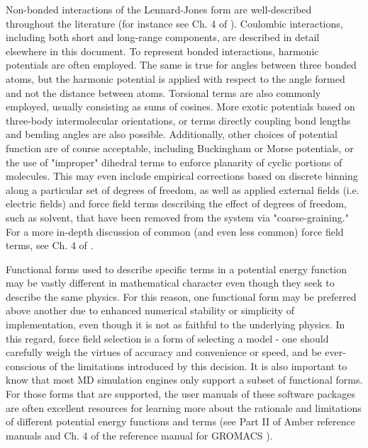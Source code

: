 \documentclass[9pt,bestpractices]{livecoms}
\begin{document}
Non-bonded interactions of the Lennard-Jones form are well-described 
throughout the literature (for instance see Ch. 4 of \citet{LeachBook}). 
Coulombic interactions, including both short and long-range components, are 
described in detail elsewhere in this document.
To represent bonded interactions, harmonic potentials are often employed. 
The same is true for angles between three bonded atoms, but the harmonic potential 
is applied with respect to the angle formed and not the distance between atoms. 
Torsional terms are also commonly employed, usually consisting as sums of 
cosines. More exotic potentials based on three-body intermolecular 
orientations, or terms directly coupling bond lengths and bending angles are 
also possible. Additionally, other choices of potential function are of course 
acceptable, including Buckingham or Morse potentials, or the use of "improper" 
dihedral terms to enforce planarity of cyclic portions of molecules. 
This may even include empirical corrections based on discrete binning 
along a particular set of degrees of freedom, as well as applied external  
fields (i.e. electric fields) and force field terms describing the effect of 
degrees of freedom, such as solvent, that have been removed from the system via 
"coarse-graining." For a more in-depth discussion of common (and even less common) force field terms, see Ch. 4 of \citet{LeachBook}.

Functional forms used to describe specific terms in a potential energy function 
may be vastly different in mathematical character even though they seek to describe the same physics. For this reason, one functional form may be preferred above another due to 
enhanced numerical stability or simplicity of implementation, even though it is not as 
faithful to the underlying physics. In this regard, force field selection is a form of 
selecting a model - one should carefully weigh the virtues of accuracy and convenience 
or speed, and be ever-conscious of the limitations introduced by this decision.
It is also important to know that most MD simulation engines only support a 
subset of functional forms. For those forms that are supported, 
the user manuals of these software packages are often excellent resources 
for learning more about the rationale and limitations of different 
potential energy functions and terms (see Part II of Amber reference manuals\citep{AmberManual} 
and Ch. 4 of the reference manual for GROMACS \citep{GROMACSManual}).
\end{document}
